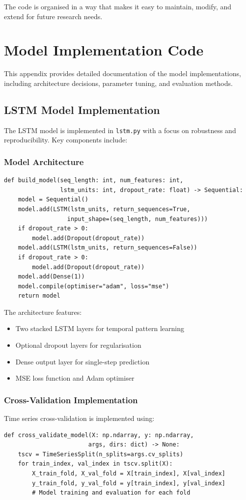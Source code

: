 \documentclass[12pt,a4paper]{report}
\begin{document}
The code is organised in a way that makes it easy to maintain, modify, and extend for future research needs.

\chapter{Model Implementation Code}
\label{appendix:implementation}

This appendix provides detailed documentation of the model implementations, including architecture decisions, parameter tuning, and evaluation methods.

\section{LSTM Model Implementation}
The LSTM model is implemented in \texttt{lstm.py} with a focus on robustness and reproducibility. Key components include:

\subsection{Model Architecture}
\begin{verbatim}
def build_model(seq_length: int, num_features: int, 
                lstm_units: int, dropout_rate: float) -> Sequential:
    model = Sequential()
    model.add(LSTM(lstm_units, return_sequences=True, 
                  input_shape=(seq_length, num_features)))
    if dropout_rate > 0:
        model.add(Dropout(dropout_rate))
    model.add(LSTM(lstm_units, return_sequences=False))
    if dropout_rate > 0:
        model.add(Dropout(dropout_rate))
    model.add(Dense(1))
    model.compile(optimiser="adam", loss="mse")
    return model
\end{verbatim}

The architecture features:
\begin{itemize}
    \item Two stacked LSTM layers for temporal pattern learning
    \item Optional dropout layers for regularisation
    \item Dense output layer for single-step prediction
    \item MSE loss function and Adam optimiser
\end{itemize}

\subsection{Cross-Validation Implementation}
Time series cross-validation is implemented using:
\begin{verbatim}
def cross_validate_model(X: np.ndarray, y: np.ndarray, 
                        args, dirs: dict) -> None:
    tscv = TimeSeriesSplit(n_splits=args.cv_splits)
    for train_index, val_index in tscv.split(X):
        X_train_fold, X_val_fold = X[train_index], X[val_index]
        y_train_fold, y_val_fold = y[train_index], y[val_index]
        # Model training and evaluation for each fold
\end{verbatim}
\end{document}
